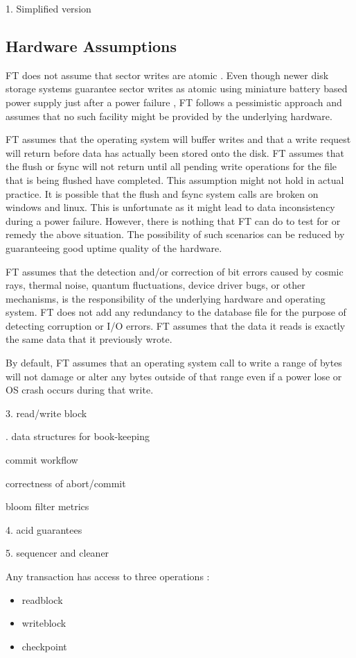 \documentclass[11pt,a4paper]{article}
\begin{document}
1. Simplified version

\subsection{Hardware Assumptions} FT does not assume that sector writes are atomic . Even though newer disk storage systems guarantee sector writes as atomic using miniature battery based power supply just after a power failure , FT follows a pessimistic approach and assumes that no such facility might be provided by the underlying hardware.

FT assumes that the operating system will buffer writes and that a write request will return before data has actually been stored onto the disk. FT assumes that the flush or fsync will not return until all pending write operations for the file that is being flushed have completed. This assumption might not hold in actual practice. It is possible that the flush and fsync system calls are broken on windows and linux. This is unfortunate as it might lead to data inconsistency during a power failure. However, there is nothing that FT can do to test for or remedy the above situation. The possibility of such scenarios can be reduced by guaranteeing good uptime quality of the hardware.

FT assumes that the detection and/or correction of bit errors caused by cosmic rays, thermal noise, quantum fluctuations, device driver bugs, or other mechanisms, is the responsibility of the underlying hardware and operating system. FT does not add any redundancy to the database file for the purpose of detecting corruption or I/O errors. FT assumes that the data it reads is exactly the same data that it previously wrote.

By default, FT assumes that an operating system call to write a range of bytes will not damage or alter any bytes outside of that range even if a power lose or OS crash occurs during that write. 



3. read/write block 

. data structures for book-keeping

commit workflow

correctness of abort/commit

bloom filter metrics

4. acid guarantees

5. sequencer and cleaner


Any transaction has access to three operations :
\begin{itemize}
\item readblock
\item writeblock 
\item checkpoint
\end{itemize}
\end{document}

